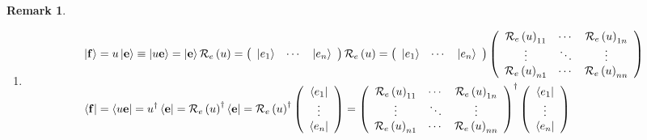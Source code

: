 \documentclass[aps,preprint]{revtex4}%
\newtheorem{remark}[theorem]{Remark}
\begin{document}
\begin{remark}
\begin{enumerate}
\item
\begin{align}
\left\vert \mathbf{f}\right\rangle  &  =u\left\vert \mathbf{e}\right\rangle
\equiv\left\vert u\mathbf{e}\right\rangle =\left\vert \mathbf{e}\right\rangle
\mathcal{R}_{e}\left(  u\right)  =\left(
\begin{array}
[c]{ccc}%
\left\vert e_{1}\right\rangle  & \cdots & \left\vert e_{n}\right\rangle
\end{array}
\right)  \mathcal{R}_{e}\left(  u\right)  =\left(
\begin{array}
[c]{ccc}%
\left\vert e_{1}\right\rangle  & \cdots & \left\vert e_{n}\right\rangle
\end{array}
\right)  \left(
\begin{array}
[c]{ccc}%
\mathcal{R}_{e}\left(  u\right)  _{11} & \cdots & \mathcal{R}_{e}\left(
u\right)  _{1n}\\
\vdots & \ddots & \vdots\\
\mathcal{R}_{e}\left(  u\right)  _{n1} & \cdots & \mathcal{R}_{e}\left(
u\right)  _{nn}%
\end{array}
\right) \\
\left\langle \mathbf{f}\right\vert  &  =\left\langle u\mathbf{e}\right\vert
=u^{\dagger}\left\langle \mathbf{e}\right\vert =\mathcal{R}_{e}\left(
u\right)  ^{\dagger}\left\langle \mathbf{e}\right\vert =\mathcal{R}_{e}\left(
u\right)  ^{\dagger}\left(
\begin{array}
[c]{c}%
\left\langle e_{1}\right\vert \\
\vdots\\
\left\langle e_{n}\right\vert
\end{array}
\right)  =\left(
\begin{array}
[c]{ccc}%
\mathcal{R}_{e}\left(  u\right)  _{11} & \cdots & \mathcal{R}_{e}\left(
u\right)  _{1n}\\
\vdots & \ddots & \vdots\\
\mathcal{R}_{e}\left(  u\right)  _{n1} & \cdots & \mathcal{R}_{e}\left(
u\right)  _{nn}%
\end{array}
\right)  ^{\dagger}\left(
\begin{array}
[c]{c}%
\left\langle e_{1}\right\vert \\
\vdots\\
\left\langle e_{n}\right\vert
\end{array}
\right)
\end{align}



\end{enumerate}
\end{remark}
\end{document}
